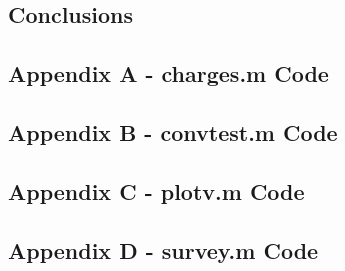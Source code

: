 \documentclass[10pt]{article}
\begin{document}
\pagebreak

\subsection*{Conclusions}


\pagebreak

\subsection*{Appendix A - charges.m Code}


\pagebreak

\subsection*{Appendix B - convtest.m Code}


\pagebreak

\subsection*{Appendix C - plotv.m Code}


\pagebreak

\subsection*{Appendix D - survey.m Code}


\pagebreak
\end{document}
